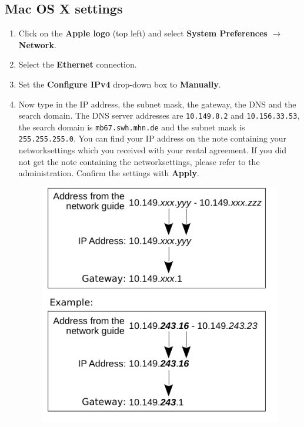 \documentclass[a4paper,12pt]{scrartcl}
\newcommand{\optemph}[1]{\textbf{#1}}
\begin{document}
\subsection*{Mac OS X settings}
\begin{enumerate}
	\item Click on the \optemph{Apple logo} (top left) and select \optemph{System Preferences} $\rightarrow$ \optemph{Network}.
	\item Select the \optemph{Ethernet} connection.
	\item Set the \optemph{Configure IPv4} drop-down box to \optemph{Manually}.
	\item Now type in the IP address, the subnet mask, the gateway, the DNS and the search domain. The DNS server addresses are \nolinkurl{10.149.8.2} and \nolinkurl{10.156.33.53}, the search domain is \nolinkurl{mb67.swh.mhn.de} and the subnet mask is \nolinkurl{255.255.255.0}. You can find your IP address on the note containing your networksettings which you received with your rental agreement. If you did not get the note containing the networksettings, please refer to the administration. Confirm the settings with \optemph{Apply}.
      \begin{figure}[h!]
      \centering
        \begin{minipage}[c]{0.38\linewidth}
          \centering
          \includegraphics[width=\linewidth,keepaspectratio]{Bilder/IP_Gerneric_EN_mb}

\end{minipage}
\end{figure}
\end{enumerate}
\end{document}
